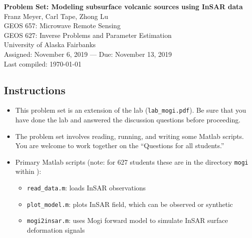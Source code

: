 \documentclass[11pt,titlepage,fleqn]{article}
\begin{document}

\begin{spacing}{1.2}
\centering
{\large \bf Problem Set: Modeling subsurface volcanic sources using InSAR data} \\
Franz Meyer, Carl Tape, Zhong Lu  %
\\
GEOS 657: Microwave Remote Sensing \\
GEOS 627: Inverse Problems and Parameter Estimation \\
University of Alaska Fairbanks \\
Assigned: November 6, 2019 --- Due: November 13, 2019 \\
Last compiled: \today
\end{spacing}


\subsection*{Instructions}

\begin{itemize}
\item This problem set is an extension of the lab (\verb+lab_mogi.pdf+). Be sure that you have done the lab and answered the discussion questions before proceeding.

\item The problem set involves reading, running, and writing some Matlab scripts. You are welcome to work together on the ``Questions for all students.''

\item Primary Matlab scripts (note: for 627 students these are in the directory \verb+mogi+ within \repodir):
\begin{itemize}
\item \verb+read_data.m+: loads InSAR observations
\item \verb+plot_model.m+: plots InSAR field, which can be observed or synthetic
\item \verb+mogi2insar.m+: uses Mogi forward model to simulate InSAR surface deformation signals
\end{itemize}

\end{itemize}
\end{document}
